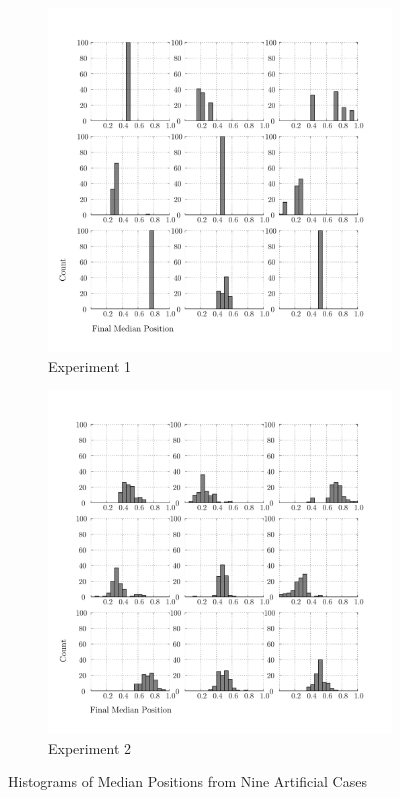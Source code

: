 \begin{figure}
    \centering
    \begin{subfigure}{0.49\textwidth}
        \includegraphics[width=\textwidth]{BDM_Reproduction/Figures/RandomGamesHist1}
        \caption{Experiment 1}
    \end{subfigure}
    \begin{subfigure}{0.49\textwidth}
        \includegraphics[width=\textwidth]{BDM_Reproduction/Figures/RandomGamesHist2}
        \caption{Experiment 2}
    \end{subfigure}

    \caption[Histograms of Median Positions]{Histograms of Median Positions from Nine Artificial Cases}
    \label{fig:random_medians}
    \figSpace
\end{figure}

